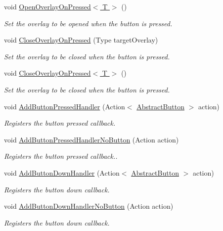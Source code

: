 \begin{DoxyCompactItemize}
void \hyperlink{class_scaffolding_1_1_abstract_button_a71ab29dc963545c57b57aa9a294f5be1}{Open\+Overlay\+On\+Pressed$<$ T $>$} ()
\begin{DoxyCompactList}\small\item\em Set the overlay to be opened when the button is pressed. \end{DoxyCompactList}\item 
void \hyperlink{class_scaffolding_1_1_abstract_button_abb180405fc64d38655f5be2a935dc71c}{Close\+Overlay\+On\+Pressed} (Type target\+Overlay)
\begin{DoxyCompactList}\small\item\em Set the overlay to be closed when the button is pressed. \end{DoxyCompactList}\item 
void \hyperlink{class_scaffolding_1_1_abstract_button_acf05350651bf38ee6c7928c6c2f35c54}{Close\+Overlay\+On\+Pressed$<$ T $>$} ()
\begin{DoxyCompactList}\small\item\em Set the overlay to be closed when the button is pressed. \end{DoxyCompactList}\item 
void \hyperlink{class_scaffolding_1_1_abstract_button_ae99a36e41eb5d2975137669c44aafe26}{Add\+Button\+Pressed\+Handler} (Action$<$ \hyperlink{class_scaffolding_1_1_abstract_button}{Abstract\+Button} $>$ action)
\begin{DoxyCompactList}\small\item\em Registers the button pressed callback. \end{DoxyCompactList}\item 
void \hyperlink{class_scaffolding_1_1_abstract_button_a797be871a53380fa6aaed1bad0d64002}{Add\+Button\+Pressed\+Handler\+No\+Button} (Action action)
\begin{DoxyCompactList}\small\item\em Registers the button pressed callback.. \end{DoxyCompactList}\item 
void \hyperlink{class_scaffolding_1_1_abstract_button_ac5e452a4c33391900a861e2e0275cc58}{Add\+Button\+Down\+Handler} (Action$<$ \hyperlink{class_scaffolding_1_1_abstract_button}{Abstract\+Button} $>$ action)
\begin{DoxyCompactList}\small\item\em Registers the button down callback. \end{DoxyCompactList}\item 
void \hyperlink{class_scaffolding_1_1_abstract_button_a33bcbcb549fceb9e1f6df0b0fff440aa}{Add\+Button\+Down\+Handler\+No\+Button} (Action action)
\begin{DoxyCompactList}\small\item\em Registers the button down callback. \end{DoxyCompactList}\end{DoxyCompactItemize}
